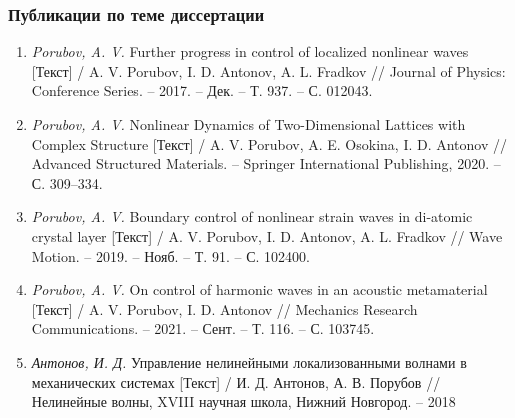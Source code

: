 \begin{frame} %
	\frametitle{Публикации по теме диссертации}
	\begin{small}
\begin{enumerate}
	\item \textit{Porubov, A. V.} Further progress in control of localized nonlinear waves [Текст] / A. V. Porubov, I. D. Antonov, A. L. Fradkov // Journal of Physics: Conference Series. -- 2017. -- Дек. -- Т. 937. -- С. 012043.	
	
	\item \textit{Porubov, A. V.} Nonlinear Dynamics of Two-Dimensional Lattices with Complex Structure [Текст] / A. V. Porubov, A. E. Osokina, I. D. Antonov // Advanced Structured Materials. -- Springer International Publishing, 2020. -- С. 309--334.
	
	\item \textit{Porubov, A. V.} Boundary control of nonlinear strain waves in di-atomic crystal layer [Текст] / A. V. Porubov, I. D. Antonov, A. L. Fradkov // Wave Motion. -- 2019. -- Нояб. -- Т. 91. -- С. 102400.
	
	\item \textit{Porubov, A. V.} On control of harmonic waves in an acoustic metamaterial [Текст] / A. V. Porubov, I. D. Antonov // Mechanics Research Communications. -- 2021. -- Сент. -- Т. 116. -- С. 103745.
	
	\item \textit{Антонов, И. Д.} Управление нелинейными локализованными волнами в механических системах [Текст] / И. Д. Антонов, А. В. Порубов // Нелинейные волны, XVIII научная школа, Нижний Новгород. -- 2018
\end{enumerate}
\end{small}
\end{frame}


